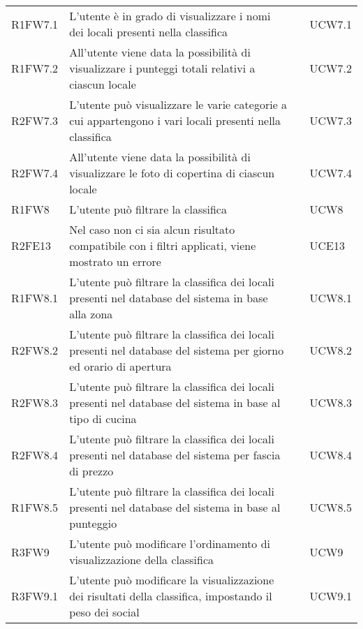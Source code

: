 \begin{longtable}{ m{}<{\centering}  m{}<{\centering}  m{}<{\centering}  m{}<{\centering}}
	R1FW7.1 & L’utente è in grado di visualizzare i nomi dei locali presenti nella classifica & \Ob & UCW7.1 \\

	R1FW7.2 & All’utente viene data la possibilità di visualizzare i punteggi totali relativi a ciascun locale & \Ob & UCW7.2 \\

	R2FW7.3 & L’utente può visualizzare le varie categorie a cui appartengono i vari locali presenti nella classifica & \De & UCW7.3 \\

	R2FW7.4 & All’utente viene data la possibilità di visualizzare le foto di copertina di ciascun locale & \De & UCW7.4 \\
	 
	R1FW8 & L’utente può filtrare la classifica & \Ob & UCW8\\		
	
	R2FE13 & Nel caso non ci sia alcun risultato compatibile con i filtri applicati, viene mostrato un errore & \De & UCE13\\	
	 
	R1FW8.1 & L’utente può filtrare la classifica dei locali presenti nel database del sistema in base alla zona & \Ob & UCW8.1\\	
	 
	R2FW8.2 & L’utente può filtrare la classifica dei locali presenti nel database del sistema per giorno ed orario di apertura & \De & UCW8.2\\	
	 
	R2FW8.3 & L’utente può filtrare la classifica dei locali presenti nel database del sistema in base al tipo di cucina & \De & UCW8.3\\	
	 
	R2FW8.4 & L’utente può filtrare la classifica dei locali presenti nel database del sistema per fascia di prezzo & \De & UCW8.4\\	 
	 
	R1FW8.5 & L’utente può filtrare la classifica dei locali presenti nel database del sistema in base al punteggio & \Ob & UCW8.5\\	 
	 
	R3FW9 & L’utente può modificare l’ordinamento di visualizzazione della classifica & \Fa & UCW9\\	
	 
	R3FW9.1 & L’utente può modificare la visualizzazione dei risultati della classifica, impostando il peso dei social & \Fa & UCW9.1\\	 
	 

\end{longtable}
